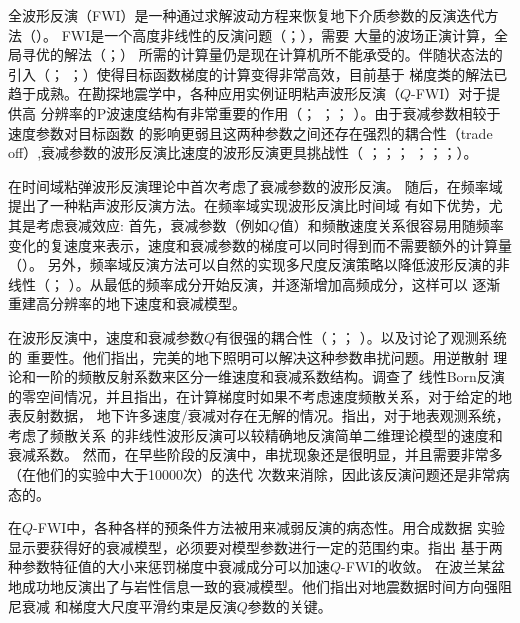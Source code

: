 全波形反演（FWI）是一种通过求解波动方程来恢复地下介质参数的反演迭代方法（）。
FWI是一个高度非线性的反演问题（；），需要
大量的波场正演计算，全局寻优的解法（；）
所需的计算量仍是现在计算机所不能承受的。伴随状态法的引入（；
；）使得目标函数梯度的计算变得非常高效，目前基于
梯度类的解法已趋于成熟。在勘探地震学中，各种应用实例证明粘声波形反演（$Q$-FWI）对于提供高
分辨率的P波速度结构有非常重要的作用（； 
；； ）。由于衰减参数相较于速度参数对目标函数
的影响更弱且这两种参数之间还存在强烈的耦合性（trade off）,衰减参数的波形反演比速度的波形反演更具挑战性（
；；； 
；；；）。

在时间域粘弹波形反演理论中首次考虑了衰减参数的波形反演。
随后，在频率域提出了一种粘声波形反演方法。在频率域实现波形反演比时间域
有如下优势，尤其是考虑衰减效应: 首先，衰减参数（例如$Q$值）和频散速度关系很容易用随频率
变化的复速度来表示，速度和衰减参数的梯度可以同时得到而不需要额外的计算量（）。
另外，频率域反演方法可以自然的实现多尺度反演策略以降低波形反演的非线性（；
）。从最低的频率成分开始反演，并逐渐增加高频成分，这样可以
逐渐重建高分辨率的地下速度和衰减模型。

在波形反演中，速度和衰减参数$Q$有很强的耦合性（；；
）。以及讨论了观测系统的
重要性。他们指出，完美的地下照明可以解决这种参数串扰问题。用逆散射
理论和一阶的频散反射系数来区分一维速度和衰减系数结构。调查了
线性Born反演的零空间情况，并且指出，在计算梯度时如果不考虑速度频散关系，对于给定的地表反射数据，
地下许多速度/衰减对存在无解的情况。指出，对于地表观测系统，考虑了频散关系
的非线性波形反演可以较精确地反演简单二维理论模型的速度和衰减系数。
然而，在早些阶段的反演中，串扰现象还是很明显，并且需要非常多（在他们的实验中大于10000次）的迭代
次数来消除，因此该反演问题还是非常病态的。

在$Q$-FWI中，各种各样的预条件方法被用来减弱反演的病态性。用合成数据
实验显示要获得好的衰减模型，必须要对模型参数进行一定的范围约束。指出
基于两种参数特征值的大小来惩罚梯度中衰减成分可以加速$Q$-FWI的收敛。
在波兰某盆地成功地反演出了与岩性信息一致的衰减模型。他们指出对地震数据时间方向强阻尼衰减
和梯度大尺度平滑约束是反演$Q$参数的关键。

